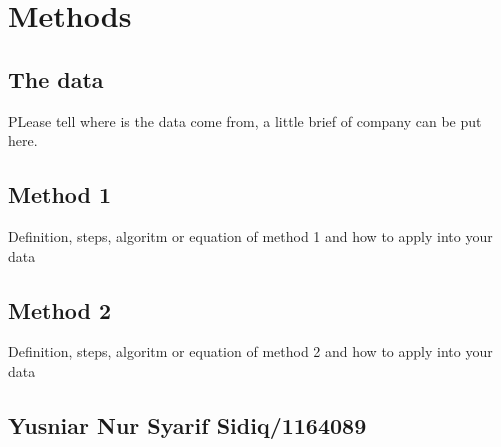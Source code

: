 \chapter{Methods}

\section{The data}
PLease tell where is the data come from, a little brief of company can be put here.

\section{Method 1}
Definition, steps, algoritm or equation of method 1 and how to apply into your data
\section{Method 2}
Definition, steps, algoritm or equation of method 2 and how to apply into your data

\section{Yusniar Nur Syarif Sidiq/1164089}
